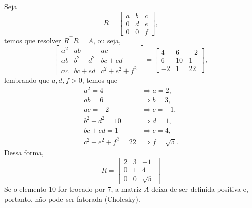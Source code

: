 \begin{questions}
\begin{solution}
Seja
\[
	R = 
	\begin{bmatrix}
		a & b & c \\
        0 & d & e \\
        0 & 0 & f
	\end{bmatrix},
\]
temos que resolver $R^\top  R = A$, ou seja,
\[
	\begin{bmatrix}
		a^2 & ab & ac \\
        ab & b^2+d^2 & bc+ed \\
        ac & bc+ed & c^2+e^2+f^2
	\end{bmatrix}
    =
    \begin{bmatrix}
	4 & 6 & -2\\
    6 & 10 & 1\\
    -2 & 1 & 22
\end{bmatrix},
\]
lembrando que $a,d,f > 0$, temos que
\begin{align*}
	a^2 = 4 &\Rightarrow a = 2,\\
    ab = 6 &\Rightarrow b = 3,\\
    ac = -2 &\Rightarrow c = -1,\\
    b^2+d^2 = 10 &\Rightarrow d = 1,\\
    bc+ed = 1 &\Rightarrow e = 4,\\
    c^2+e^2+f^2 = 22 &\Rightarrow f = \sqrt{5}.
\end{align*}
Dessa forma,
\[
	R = 
	\begin{bmatrix}
		2 & 3 & -1 \\
        0 & 1 & 4 \\
        0 & 0 & \sqrt{5}
	\end{bmatrix}
\]
Se o elemento 10 for trocado por 7, a matriz $A$ deixa de ser definida positiva e, portanto, não pode ser fatorada (Cholesky).
\end{solution}


\end{questions}
